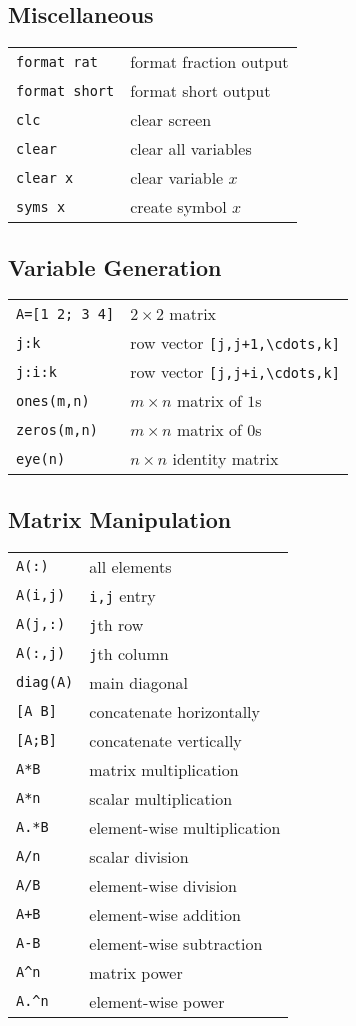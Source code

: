 \documentclass[12pt, a4paper]{article}
\begin{document}
\begin{multicols*}{3}
\subsection{Miscellaneous}
\begin{tabular}{ll}
  \verb|format rat| & format fraction output\\
  \verb|format short| & format short output\\
  \verb|clc| & clear screen\\
  \verb|clear| & clear all variables\\
  \verb|clear x| & clear variable $x$\\
  \verb|syms x| & create symbol $x$
\end{tabular}

\subsection{Variable Generation}
\begin{tabular}{ll}
  \verb|A=[1 2; 3 4]| & $2\times 2$ matrix\\
  \verb|j:k| & row vector \verb|[j,j+1,\cdots,k]|\\
  \verb|j:i:k| & row vector \verb|[j,j+i,\cdots,k]|\\
  \verb|ones(m,n)| & $m\times n$ matrix of $1$s\\
  \verb|zeros(m,n)| & $m\times n$ matrix of $0$s\\
  \verb|eye(n)| & $n\times n$ identity matrix
\end{tabular}

\subsection{Matrix Manipulation}
\begin{tabular}{ll}
  \verb|A(:)| & all elements\\
  \verb|A(i,j)| & \verb|i,j| entry\\
  \verb|A(j,:)| & \verb|j|th row\\
  \verb|A(:,j)| & \verb|j|th column\\
  \verb|diag(A)| & main diagonal\\
  \verb|[A B]| & concatenate horizontally \\
  \verb|[A;B]| & concatenate vertically \\
  \verb|A*B| & matrix multiplication \\
  \verb|A*n| & scalar multiplication \\
  \verb|A.*B| & element-wise multiplication \\
  \verb|A/n| & scalar division \\
  \verb|A/B| & element-wise division \\
  \verb|A+B| & element-wise addition \\
  \verb|A-B| & element-wise subtraction \\
  \verb|A^n| & matrix power \\
  \verb|A.^n| & element-wise power \\
\end{tabular}


\end{multicols*}
\end{document}
